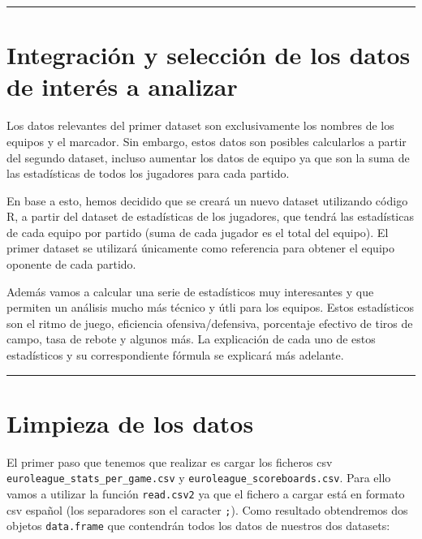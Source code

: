 \documentclass[
]{article}
\begin{document}
\begin{center}\rule{0.5\linewidth}{0.5pt}\end{center}

\hypertarget{integraciuxf3n-y-selecciuxf3n-de-los-datos-de-interuxe9s-a-analizar}{%
\section{Integración y selección de los datos de interés a
analizar}\label{integraciuxf3n-y-selecciuxf3n-de-los-datos-de-interuxe9s-a-analizar}}

Los datos relevantes del primer dataset son exclusivamente los nombres
de los equipos y el marcador. Sin embargo, estos datos son posibles
calcularlos a partir del segundo dataset, incluso aumentar los datos de
equipo ya que son la suma de las estadísticas de todos los jugadores
para cada partido.

En base a esto, hemos decidido que se creará un nuevo dataset utilizando
código R, a partir del dataset de estadísticas de los jugadores, que
tendrá las estadísticas de cada equipo por partido (suma de cada jugador
es el total del equipo). El primer dataset se utilizará únicamente como
referencia para obtener el equipo oponente de cada partido.

Además vamos a calcular una serie de estadísticos muy interesantes y que
permiten un análisis mucho más técnico y útli para los equipos. Estos
estadísticos son el ritmo de juego, eficiencia ofensiva/defensiva,
porcentaje efectivo de tiros de campo, tasa de rebote y algunos más. La
explicación de cada uno de estos estadísticos y su correspondiente
fórmula se explicará más adelante.

\begin{center}\rule{0.5\linewidth}{0.5pt}\end{center}

\hypertarget{limpieza-de-los-datos}{%
\section{Limpieza de los datos}\label{limpieza-de-los-datos}}

El primer paso que tenemos que realizar es cargar los ficheros csv
\texttt{euroleague\_stats\_per\_game.csv} y
\texttt{euroleague\_scoreboards.csv}. Para ello vamos a utilizar la
función \texttt{read.csv2} ya que el fichero a cargar está en formato
csv español (los separadores son el caracter \texttt{;}). Como resultado
obtendremos dos objetos \texttt{data.frame} que contendrán todos los
datos de nuestros dos datasets:
\end{document}
